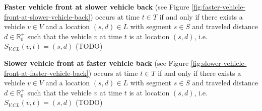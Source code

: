\documentclass[graybox]{svmult}
\begin{document}
\noindent
\textbf{Faster vehicle front at slower vehicle back} (see Figure \ref{fig:faster-vehicle-front-at-slower-vehicle-back})
occurs at time $t \in T$ if and only if there exists a vehicle $v \in V$ and a location $(s,d) \in L$ with segment $s \in S$ and traveled distance $d \in \mathbb{R}_0^+$ such that the vehicle $v$ at time $t$ is at location $(s,d)$, i.e. $S_{V.CL}(v,t) = (s,d)$ 
(TODO)
\vspace{4mm}

\noindent
\textbf{Slower vehicle front at faster vehicle back} (see Figure \ref{fig:slower-vehicle-front-at-faster-vehicle-back})
occurs at time $t \in T$ if and only if there exists a vehicle $v \in V$ and a location $(s,d) \in L$ with segment $s \in S$ and traveled distance $d \in \mathbb{R}_0^+$ such that the vehicle $v$ at time $t$ is at location $(s,d)$, i.e. $S_{V.CL}(v,t) = (s,d)$ (TODO)
\vspace{-2mm}
\end{document}
